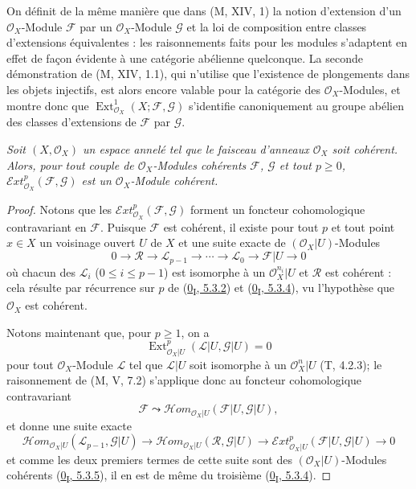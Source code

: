 \begin{env}[12.3.2]
\label{0.12.3.2-fr}
On définit de la même manière que dans (M, XIV, 1) la notion d'extension d'un
$\mathcal O_X$-Module $\mathcal F$ par un $\mathcal O_X$-Module $\mathcal G$
et la loi de composition entre classes d'extensions équivalentes : les
raisonnements faits pour les modules s'adaptent en effet de façon évidente à
une catégorie abélienne quelconque. La seconde démonstration de (M, XIV, 1.1),
qui n'utilise que l'existence de plongements dans les objets injectifs, est
alors encore valable pour la catégorie des $\mathcal O_X$-Modules, et montre
donc que $\operatorname{Ext}_{\mathcal O_X}^1(X;\mathcal F,\mathcal G)$
s'identifie canoniquement au groupe abélien des classes d'extensions de
$\mathcal F$ par $\mathcal G$.
\end{env}

\begin{proposition}[12.3.3]
\label{0.12.3.3-fr}
\emph{Soit $(X,\mathcal O_X)$ un espace annelé tel que le faisceau d'anneaux
$\mathcal O_X$ soit cohérent. Alors, pour tout couple de
$\mathcal O_X$-Modules cohérents $\mathcal F$, $\mathcal G$ et tout
$p\geq0$, $\mathcal{E}xt_{\mathcal O_X}^p(\mathcal F,\mathcal G)$ est un
$\mathcal O_X$-Module cohérent.}
\end{proposition}

\begin{proof}
Notons que les $\mathcal{E}xt_{\mathcal O_X}^p(\mathcal F,\mathcal G)$
forment un foncteur cohomologique contravariant en $\mathcal F$. Puisque
$\mathcal F$ est cohérent, il existe pour tout $p$ et tout point $x\in X$ un
voisinage ouvert $U$ de $X$ et une suite exacte de
$(\mathcal O_X|U)$-Modules
\[
0\longrightarrow\mathcal R\longrightarrow\mathcal L_{p-1}
\longrightarrow\cdots\longrightarrow\mathcal L_0
\longrightarrow\mathcal F|U\longrightarrow0
\]
où chacun des $\mathcal L_i$ ($0\leq i\leq p-1$) est isomorphe à un
$\mathcal O_X^{n_i}|U$ et $\mathcal R$ est cohérent : cela résulte par
récurrence sur $p$ de (\hyperref[0.5.3.2-fr]{0\textsubscript{I}, 5.3.2}) et
(\hyperref[0.5.3.4-fr]{0\textsubscript{I}, 5.3.4}), vu l'hypothèse que
$\mathcal O_X$ est cohérent.

Notons maintenant que, pour $p\geq1$, on a
\[
\operatorname{Ext}_{\mathcal O_X|U}^p(\mathcal L|U,\mathcal G|U)=0
\]
pour tout $\mathcal O_X$-Module $\mathcal L$ tel que $\mathcal L|U$ soit
isomorphe à un $\mathcal O_X^n|U$ (T, 4.2.3); le raisonnement de (M, V, 7.2)
s'applique donc au foncteur cohomologique contravariant
\[
\mathcal F\leadsto
\mathcal{H}om_{\mathcal O_X|U}(\mathcal F|U,\mathcal G|U),
\]
et donne une suite exacte
\[
\mathcal{H}om_{\mathcal O_X|U}(\mathcal L_{p-1},\mathcal G|U)
\longrightarrow
\mathcal{H}om_{\mathcal O_X|U}(\mathcal R,\mathcal G|U)
\longrightarrow
\mathcal{E}xt_{\mathcal O_X|U}^p(\mathcal F|U,\mathcal G|U)
\longrightarrow0
\]
et comme les deux premiers termes de cette suite sont des
$(\mathcal O_X|U)$-Modules cohérents
(\hyperref[0.5.3.5-fr]{0\textsubscript{I}, 5.3.5}), il en est de même du
troisième (\hyperref[0.5.3.4-fr]{0\textsubscript{I}, 5.3.4}).
\end{proof}

